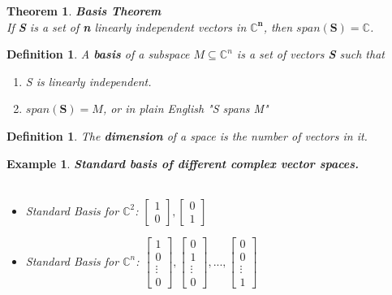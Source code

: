 \documentclass[12pt]{article}
\theoremstyle{plain}
\newtheorem{theorem}[lemma]{Theorem}
\theoremstyle{nonumberplain}
\theoremstyle{plain}
\newtheorem{definition}[lemma]{Definition}
\newtheorem{example}[lemma]{Example}
\theoremstyle{nonumberplain}
\newcommand\1{{\bf 1}}
\newcommand{\bmat}[1]{\begin{bmatrix*} #1 \end{bmatrix*}} %
\newcommand{\C}{\mathbb{C}} %
\newcommand{\<}{\left\langle}
\renewcommand{\>}{\right\rangle}
\begin{document}
\begin{theorem}
\textbf{Basis Theorem} \\
If \textbf{S} is a set of \textbf{n} linearly independent vectors in $\C^\mathbf{n}$, then $span(\mathbf{S}) = \C$.
\end{theorem}

\begin{definition}
A \textbf{basis} of a subspace $M \subseteq \C^n$ is a set of vectors \textbf{S} such that 
\begin{enumerate}
\item S is linearly independent.
\item $span(\mathbf{S}) = M$, or in plain English "S spans M"
\end{enumerate}
\end{definition}

\begin{definition}
The \textbf{dimension} of a space is the number of vectors in it. 
\end{definition}

\begin{example}
\textbf{Standard basis of different complex vector spaces.}\\ 
\\
\begin{itemize}
\item Standard Basis for $\C^2$: $\bmat{1\\ 0}, \bmat{0\\ 1}$
\item Standard Basis for  $\C^n$: $\bmat{1\\ 0\\ \vdots\\ 0}, \bmat{0\\ 1\\ \vdots\\ 0}, ... , \bmat{0\\ 0\\ \vdots\\ 1}$
\end{itemize}
\end{example}
\end{document}
